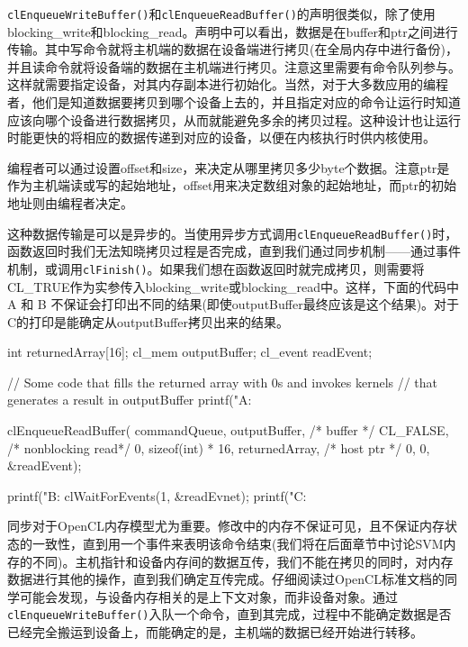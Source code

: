 
\texttt{clEnqueueWriteBuffer()}和\texttt{clEnqueueReadBuffer()}的声明很类似，除了使用blocking\_\allowbreak{}write和blocking\_\allowbreak{}read。声明中可以看出，数据是在buffer和ptr之间进行传输。其中写命令就将主机端的数据在设备端进行拷贝(在全局内存中进行备份)，并且读命令就将设备端的数据在主机端进行拷贝。注意这里需要有命令队列参与。这样就需要指定设备，对其内存副本进行初始化。当然，对于大多数应用的编程者，他们是知道数据要拷贝到哪个设备上去的，并且指定对应的命令让运行时知道应该向哪个设备进行数据拷贝，从而就能避免多余的拷贝过程。这种设计也让运行时能更快的将相应的数据传递到对应的设备，以便在内核执行时供内核使用。

编程者可以通过设置offset和size，来决定从哪里拷贝多少byte个数据。注意ptr是作为主机端读或写的起始地址，offset用来决定数组对象的起始地址，而ptr的初始地址则由编程者决定。

这种数据传输是可以是异步的。当使用异步方式调用\texttt{clEnqueueReadBuffer()}时，函数返回时我们无法知晓拷贝过程是否完成，直到我们通过同步机制——通过事件机制，或调用\texttt{clFinish()}。如果我们想在函数返回时就完成拷贝，则需要将CL\_\allowbreak{}TRUE作为实参传入blocking\_\allowbreak{}write或blocking\_\allowbreak{}read中。这样，下面的代码中A 和 B 不保证会打印出不同的结果(即使outputBuffer最终应该是这个结果)。对于C的打印是能确定从outputBuffer拷贝出来的结果。

\begin{codebox}[cpp]
int returnedArray[16];
cl_mem outputBuffer;
cl_event readEvent;

// Some code that fills the returned array with 0s and invokes kernels
// that generates a result in outputBuffer
printf("A: %

clEnqueueReadBuffer(
  commandQueue,
  outputBuffer, /* buffer */
  CL_FALSE, /* nonblocking read*/
  0,
  sizeof(int) * 16,
  returnedArray, /* host ptr */
  0,
  0,
  &readEvent);

printf("B: %
clWaitForEvents(1, &readEvnet);
printf("C: %
\end{codebox}

同步对于OpenCL内存模型尤为重要。修改中的内存不保证可见，且不保证内存状态的一致性，直到用一个事件来表明该命令结束(我们将在后面章节中讨论SVM内存的不同)。主机指针和设备内存间的数据互传，我们不能在拷贝的同时，对内存数据进行其他的操作，直到我们确定互传完成。仔细阅读过OpenCL标准文档的同学可能会发现，与设备内存相关的是上下文对象，而非设备对象。通过\texttt{clEnqueueWriteBuffer()}入队一个命令，直到其完成，过程中不能确定数据是否已经完全搬运到设备上，而能确定的是，主机端的数据已经开始进行转移。

